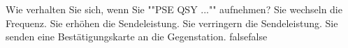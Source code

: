     {Wie verhalten Sie sich, wenn Sie ""PSE QSY ..."" aufnehmen?}
    {Sie wechseln die Frequenz.}
    {Sie erhöhen die Sendeleistung.}
    {Sie verringern die Sendeleistung.}
    {Sie senden eine Bestätigungskarte an die Gegenstation.}
    {false}{false}